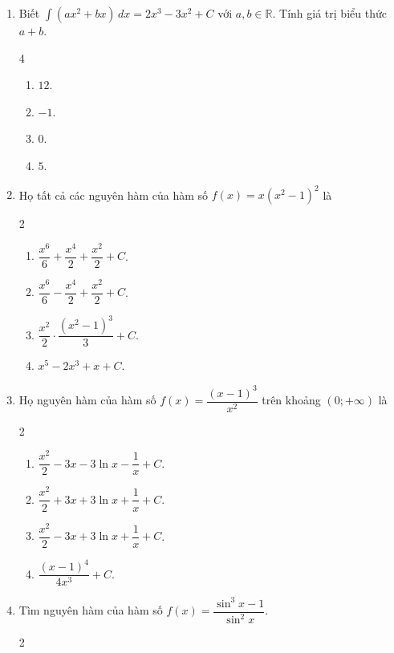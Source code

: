 \documentclass[12pt]{article}
\begin{document}
\begin{enumerate}[label=\textbf{Câu \arabic*.}]
		\item Biết $\displaystyle \int (ax^2 + bx) \,dx = 2x^3 - 3x^2 + C$ với $a, b \in \mathbb{R}$. Tính giá trị biểu thức $a + b$.
		\begin{multicols}{4}
			\begin{enumerate}[label=\textbf{\Alph*.}]
				
				\item $12$.
				\item $-1$.
				\item $0$.
				\item $5$.
			\end{enumerate}
		\end{multicols}
		
		\item Họ tất cả các nguyên hàm của hàm số $f(x) = x(x^2 - 1)^2$ là
		\begin{multicols}{2}
			\begin{enumerate}[label=\textbf{\Alph*.}]
				
				\item $\dfrac{x^6}{6} + \dfrac{x^4}{2} + \dfrac{x^2}{2} + C$.
				\item $\dfrac{x^6}{6} - \dfrac{x^4}{2} + \dfrac{x^2}{2} + C$.
				\item $\dfrac{x^2}{2} \cdot \dfrac{(x^2 - 1)^3}{3} + C$.
				\item $x^5 - 2x^3 + x + C$.
			\end{enumerate}
		\end{multicols}
		
		\item Họ nguyên hàm của hàm số $f(x) = \dfrac{(x-1)^3}{x^2}$ trên khoảng $(0; +\infty)$ là
		\begin{multicols}{2}
			\begin{enumerate}[label=\textbf{\Alph*.}]
				
				\item $\dfrac{x^2}{2} - 3x - 3\ln x - \dfrac{1}{x} + C$.
				\item $\dfrac{x^2}{2} + 3x + 3\ln x + \dfrac{1}{x} + C$.
				\item $\dfrac{x^2}{2} - 3x + 3\ln x + \dfrac{1}{x} + C$.
				\item $\dfrac{(x-1)^4}{4x^3} + C$.
			\end{enumerate}
		\end{multicols}
		
		\item Tìm nguyên hàm của hàm số $f(x) = \dfrac{\sin^3 x - 1}{\sin^2 x}$.
		\begin{multicols}{2}
			\begin{enumerate}[label=\textbf{\Alph*.}]
				

\end{enumerate}
\end{multicols}
\end{enumerate}
\end{document}
